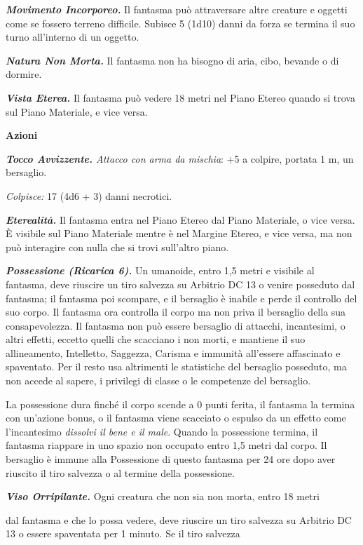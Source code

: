\begin{multicols}{2}
\emph{\textbf{Movimento Incorporeo.}} Il fantasma può attraversare altre
creature e oggetti come se fossero terreno difficile. Subisce 5 (1d10)
danni da forza se termina il suo turno all'interno di un oggetto.

\emph{\textbf{Natura Non Morta.}} Il fantasma non ha bisogno di aria,
cibo, bevande o di dormire.

\emph{\textbf{Vista Eterea.}} Il fantasma può vedere 18 metri nel Piano
Etereo quando si trova sul Piano Materiale, e vice versa.

\smallskip\textbf{Azioni}

\emph{\textbf{Tocco Avvizzente.} Attacco con arma da mischia}: +5 a
colpire, portata 1 m, un bersaglio.

\emph{Colpisce:} 17 (4d6 + 3) danni necrotici.

\emph{\textbf{Eterealità.}} Il fantasma entra nel Piano Etereo dal Piano
Materiale, o vice versa. È visibile sul Piano Materiale mentre è nel
Margine Etereo, e vice versa, ma non può interagire con nulla che si
trovi sull'altro piano.

\emph{\textbf{Possessione (Ricarica 6).}} Un umanoide, entro 1,5 metri e
visibile al fantasma, deve riuscire un tiro salvezza su Arbitrio DC 13 o
venire posseduto dal fantasma; il fantasma poi scompare, e il bersaglio
è inabile e perde il controllo del suo corpo. Il fantasma ora controlla
il corpo ma non priva il bersaglio della sua consapevolezza. Il fantasma
non può essere bersaglio di attacchi, incantesimi, o altri effetti,
eccetto quelli che scacciano i non morti, e mantiene il suo
allineamento, Intelletto, Saggezza, Carisma e immunità all'essere
affascinato e spaventato. Per il resto usa altrimenti le statistiche del
bersaglio posseduto, ma non accede al sapere, i privilegi di classe o le
competenze del bersaglio.

La possessione dura finché il corpo scende a 0 punti ferita, il fantasma
la termina con un'azione bonus, o il fantasma viene scacciato o espulso
da un effetto come l'incantesimo \emph{dissolvi il bene e il male}.
Quando la possessione termina, il fantasma riappare in uno spazio non
occupato entro 1,5 metri dal corpo. Il bersaglio è immune alla
Possessione di questo fantasma per 24 ore dopo aver riuscito il tiro
salvezza o al termine della possessione.

\emph{\textbf{Viso Orripilante.}} Ogni creatura che non sia non morta,
entro 18 metri

dal fantasma e che lo possa vedere, deve riuscire un tiro salvezza su Arbitrio DC 13 o essere spaventata per 1 minuto. Se il tiro salvezza


\end{multicols}
